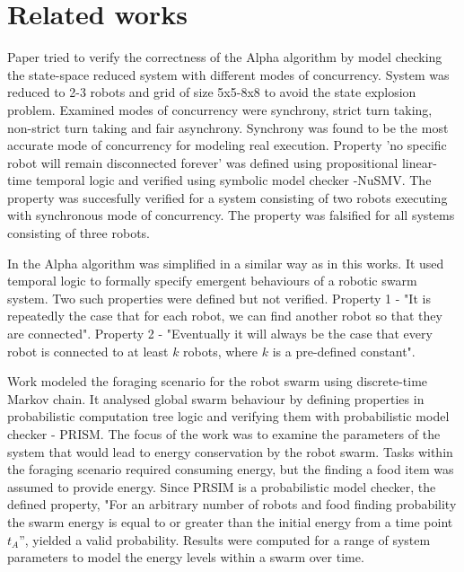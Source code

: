 \section{Related works}

Paper  \cite{Towards_Temporal_Verification_of_Emergent_Behaviours_in_Swarm_Robotic_Systems} tried to verify the correctness of the Alpha algorithm by model checking the state-space reduced system with different modes of concurrency. System was reduced to 2-3 robots and grid of size 5x5-8x8 to avoid the state explosion problem. Examined modes of concurrency were synchrony, strict turn taking, non-strict turn taking and fair asynchrony. Synchrony was found to be the most accurate mode of concurrency for modeling real execution. Property 'no specific robot will remain disconnected forever' was defined using propositional linear-time temporal logic and verified using symbolic model checker -NuSMV. The property was succesfully verified for a system consisting of two robots executing with synchronous mode of concurrency. The property was falsified for all systems consisting of three robots.

In \cite{On_Formal_Specification_of_Emergent_Behaviours_in_Swarm_Robotic_Systems} the Alpha algorithm was simplified in a similar way as in this works. It used temporal logic to formally specify emergent behaviours of a robotic swarm system. Two such properties were defined but not verified. Property 1 - "It is repeatedly the case that for each robot, we can find another robot so that they are connected". Property 2 - "Eventually it will always be the case that every robot is connected to at least $k$ robots, where $k$ is a pre-defined constant".

Work \cite{Formal_Verification_of_Probabilistic_Swarm_Behaviours} modeled the foraging scenario for the robot swarm using discrete-time Markov chain. It analysed global swarm behaviour by defining properties in probabilistic computation tree logic and verifying them with probabilistic model checker - PRISM. The focus of the work was to examine the parameters of the system that would lead to energy conservation by the robot swarm. Tasks within the foraging scenario required consuming energy, but the finding a food item was assumed to provide energy. Since PRSIM is a probabilistic model checker, the defined property, "For an arbitrary number of robots and food finding probability the swarm energy is equal to or greater than the initial energy from a time point $t_A$”, yielded a valid probability. Results were computed for a range of system parameters to model the energy levels within a swarm over time.  
